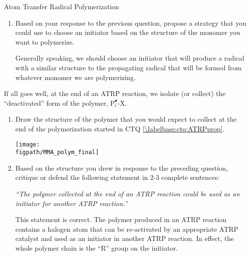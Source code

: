 \begin{activity}{Atom Transfer Radical Polymerization}
\begin{ctqs}
\begin{enumerate}
\begin{solution}[1.25in]{}
				Strictly speaking, ensuring that all chains activate ``at once'' (as required for a living polymerization) would require the equilibrium constant for the initial equilibrium to be higher than that for the ATRP equilibrium, but in practice, having these be roughly equal works well enough.
			\end{solution}
			
			\item Based on your response to the previous question, propose a strategy that you could use to choose an initiator based on the structure of the monomer you want to polymerize.
	
			\begin{solution}[1.25in]{}
			
				Generally speaking, we should choose an initiator that will produce a radical with a similar structure to the propagating radical that will be formed from whatever monomer we are polymerizing.
			
			\end{solution}
			
		\end{enumerate}
		
	\question If all goes well, at the end of an ATRP reaction, we isolate (or collect) the ``deactivated'' form of the polymer, $\text{P}_i^\bullet\text{-X}$.
	
		\begin{enumerate}
			\item Draw the structure of the polymer that you would expect to collect at the end of the polymerization started in CTQ \ref{\labelbase:ctq:ATRPprop}.
				
				\begin{solution}[1.5in]{}
			\centerline{\texttt{[image: \\figpath/MMA\_polym\_final]}}		
				\end{solution}
			
			\item Based on the structure you drew in response to the preceding question, critique or defend the following statement in 2-3 complete sentences:
			
				\emph{``The polymer collected at the end of an ATRP reaction could be used as an initiator for another ATRP reaction.''}
				
				\begin{solution}[2in]{}
				
					This statement is correct. The polymer produced in an ATRP reaction contains a halogen atom that can be re-activated by an appropriate ATRP catalyst and used as an initiator in another ATRP reaction.  In effect, the whole polymer chain is the ``R'' group on the initiator.
					

\end{solution}
\end{enumerate}
\end{ctqs}
\end{activity}
